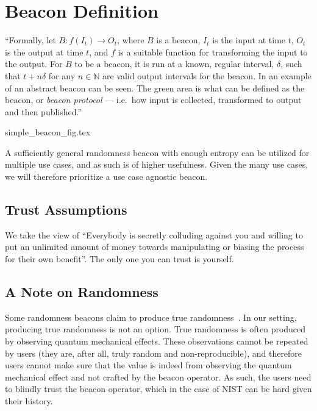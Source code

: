 \section{Beacon Definition}


\enquote{Formally, let $B: f(I_t) \rightarrow O_t$, where $B$ is a beacon, $I_t$ is the input at time $t$, $O_t$ is the output at time $t$, and $f$ is a suitable function for transforming the input to the output.
For $B$ to be a beacon, it is run at a known, regular interval, $\delta$, such that $t+n\delta$ for any $n \in \mathbb{N}$ are valid output intervals for the beacon.
In  an example of an abstract beacon can be seen.
The green area is what can be defined as the beacon, or \emph{beacon protocol} --- i.e.\ how input is collected, transformed to output and then published.}

{simple_beacon_fig.tex}

A sufficiently general randomness beacon with enough entropy can be utilized for multiple use cases, and as such is of higher usefulness.
Given the many use cases, we will therefore prioritize a use case agnostic beacon.

\subsection{Trust Assumptions}

We take the view of \enquote{Everybody is secretly colluding against you and willing to put an unlimited amount of money towards manipulating or biasing the process for their own benefit}.
The only one you can trust is yourself.

\subsection{A Note on Randomness}
Some randomness beacons claim to produce true randomness~\cite{nistbeacon}.
In our setting, producing true randomness is not an option.
True randomness is often produced by observing quantum mechanical effects.
These observations cannot be repeated by users (they are, after all, truly random and non-reproducible), and therefore users cannot make sure that the value is indeed from observing the quantum mechanical effect and not crafted by the beacon operator.
As such, the users need to blindly trust the beacon operator, which in the case of NIST can be hard given their history\cite{nytimes-nsabackdoors, nytimes-nsaconstants, nist2014backdoor}.

